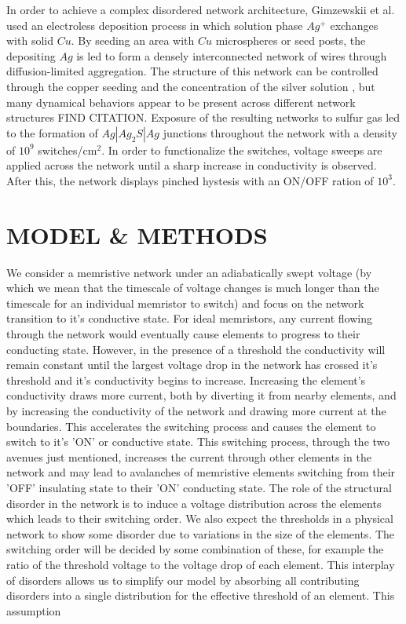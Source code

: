 \documentclass[aps,prl,preprint,groupedaddress]{revtex4-1}
\begin{document}
In order to achieve a complex disordered network architecture, Gimzewskii et
al. used an electroless deposition process in which solution phase $Ag^+$
exchanges with solid $Cu$.  By seeding an area with $Cu$ 
microspheres or seed posts, the depositing $Ag$ is led to form a
densely interconnected network of wires through diffusion-limited aggregation.
The structure of this network can be controlled through the copper
seeding and the concentration of the silver solution \cite{Avizienis2013},
but many dynamical behaviors appear to be present across different network
structures FIND CITATION.  Exposure of the resulting networks to sulfur gas
led to the formation of $Ag|Ag_2 S|Ag$ junctions throughout the network with
a density of $10^9$ switches/cm$^2$.  In order to functionalize the switches,
voltage sweeps are applied across the network until a sharp increase
in conductivity is observed.  After this, the network displays pinched
hystesis with an ON/OFF ration of $10^3$.

\section{MODEL \& METHODS}

We consider a memristive network under an adiabatically swept voltage (by
which we
mean that the timescale of voltage changes is much longer than the timescale
for an individual memristor to switch) and focus on the network transition
to it's conductive state.  For ideal memristors, any current
flowing through the network would eventually cause elements to progress to
their conducting state.  However, in the presence of a threshold the
conductivity will remain constant until the largest voltage drop in the
network has crossed it's threshold and it's conductivity begins to increase.
Increasing the
element's conductivity draws more current, both by diverting it from nearby
elements, and by increasing the conductivity of the network and drawing more
current at the boundaries.  This accelerates the switching process and causes
the element to switch to it's 'ON' or conductive state.  This switching
process,
through the two avenues just mentioned, increases the current through other
elements in the network and may lead to avalanches of memristive elements
switching from their 'OFF' insulating state to their 'ON' conducting state. 
The role of the structural disorder in the network is to induce a voltage
distribution across the elements which leads to their switching order. We also
expect the thresholds in a physical network to show some disorder due to
variations in the size of the elements. The switching order will be decided by some
combination of these, for example the ratio of the threshold voltage to the
voltage drop of each element.  This interplay of disorders allows us to
simplify our model by absorbing all contributing disorders into a single
distribution for the effective threshold of an element.  This assumption 
\end{document}
